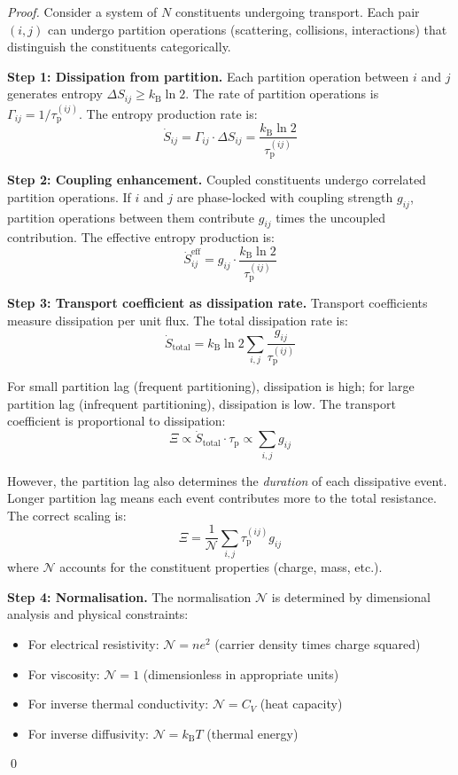 \documentclass[twocolumn,10pt,aps,prd,superscriptaddress,nofootinbib]{revtex4-2}
\theoremstyle{remark}
\newcommand{\kB}{k_{\mathrm{B}}}
\newcommand{\tauP}{\tau_{\mathrm{p}}}
\newcommand{\Gij}{g_{ij}}
\newcommand{\Norm}{\mathcal{N}}
\newcommand{\Transp}{\Xi}
\begin{document}
\begin{proof}
Consider a system of $N$ constituents undergoing transport. Each pair $(i,j)$ can undergo partition operations (scattering, collisions, interactions) that distinguish the constituents categorically.

\textbf{Step 1: Dissipation from partition.} Each partition operation between $i$ and $j$ generates entropy $\Delta S_{ij} \geq \kB \ln 2$. The rate of partition operations is $\Gamma_{ij} = 1/\tauP^{(ij)}$. The entropy production rate is:
\begin{equation}
\dot{S}_{ij} = \Gamma_{ij} \cdot \Delta S_{ij} = \frac{\kB \ln 2}{\tauP^{(ij)}}
\end{equation}

\textbf{Step 2: Coupling enhancement.} Coupled constituents undergo correlated partition operations. If $i$ and $j$ are phase-locked with coupling strength $\Gij$, partition operations between them contribute $\Gij$ times the uncoupled contribution. The effective entropy production is:
\begin{equation}
\dot{S}_{ij}^{\text{eff}} = \Gij \cdot \frac{\kB \ln 2}{\tauP^{(ij)}}
\end{equation}

\textbf{Step 3: Transport coefficient as dissipation rate.} Transport coefficients measure dissipation per unit flux. The total dissipation rate is:
\begin{equation}
\dot{S}_{\text{total}} = \kB \ln 2 \sum_{i,j} \frac{\Gij}{\tauP^{(ij)}}
\end{equation}

For small partition lag (frequent partitioning), dissipation is high; for large partition lag (infrequent partitioning), dissipation is low. The transport coefficient is proportional to dissipation:
\begin{equation}
\Transp \propto \dot{S}_{\text{total}} \cdot \tauP \propto \sum_{i,j} \Gij
\end{equation}

However, the partition lag also determines the \emph{duration} of each dissipative event. Longer partition lag means each event contributes more to the total resistance. The correct scaling is:
\begin{equation}
\Transp = \frac{1}{\Norm} \sum_{i,j} \tauP^{(ij)} \Gij
\label{eq:transport_derivation}
\end{equation}
where $\Norm$ accounts for the constituent properties (charge, mass, etc.).

\textbf{Step 4: Normalisation.} The normalisation $\Norm$ is determined by dimensional analysis and physical constraints:
\begin{itemize}
\item For electrical resistivity: $\Norm = ne^2$ (carrier density times charge squared)
\item For viscosity: $\Norm = 1$ (dimensionless in appropriate units)
\item For inverse thermal conductivity: $\Norm = C_V$ (heat capacity)
\item For inverse diffusivity: $\Norm = \kB T$ (thermal energy)
\end{itemize}
\qed
\end{proof}
\end{document}
